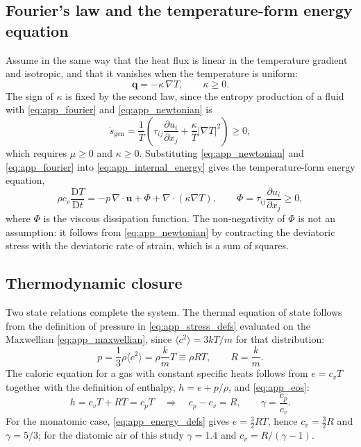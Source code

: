 \subsection{Fourier's law and the temperature-form energy equation}

Assume in the same way that the heat flux is linear in the temperature gradient and isotropic, and that it vanishes when the temperature is uniform:
\begin{equation}
    \mathbf{q} = -\kappa\,\nabla T , \qquad \kappa \ge 0 .
    \label{eq:app_fourier}
\end{equation}
The sign of $\kappa$ is fixed by the second law, since the entropy production of a fluid with \eqref{eq:app_fourier} and \eqref{eq:app_newtonian} is
\begin{equation}
    \dot{s}_{\mathrm{gen}} = \frac{1}{T}\left(\tau_{ij}\frac{\partial u_i}{\partial x_j} + \frac{\kappa}{T}|\nabla T|^2\right) \ge 0 ,
    \label{eq:app_entropy}
\end{equation}
which requires $\mu\ge0$ and $\kappa\ge0$. Substituting \eqref{eq:app_newtonian} and \eqref{eq:app_fourier} into \eqref{eq:app_internal_energy} gives the temperature-form energy equation,
\begin{equation}
    \rho c_v\frac{\mathrm{D}T}{\mathrm{D}t} = -p\,\nabla\cdot\mathbf{u} + \Phi + \nabla\cdot(\kappa\nabla T) ,
    \qquad
    \Phi = \tau_{ij}\frac{\partial u_i}{\partial x_j} \ge 0 ,
    \label{eq:app_energy_T}
\end{equation}
where $\Phi$ is the viscous dissipation function. The non-negativity of $\Phi$ is not an assumption: it follows from \eqref{eq:app_newtonian} by contracting the deviatoric stress with the deviatoric rate of strain, which is a sum of squares.

\subsection{Thermodynamic closure}

Two state relations complete the system. The thermal equation of state follows from the definition of pressure in \eqref{eq:app_stress_defs} evaluated on the Maxwellian \eqref{eq:app_maxwellian}, since $\langle c^2\rangle = 3kT/m$ for that distribution:
\begin{equation}
    p = \frac{1}{3}\rho\langle c^2\rangle = \rho\frac{k}{m}T \equiv \rho RT ,
    \qquad R = \frac{k}{m} .
    \label{eq:app_eos}
\end{equation}
The caloric equation for a gas with constant specific heats follows from $e = c_vT$ together with the definition of enthalpy, $h = e + p/\rho$, and \eqref{eq:app_eos}:
\begin{equation}
    h = c_vT + RT = c_pT
    \quad\Longrightarrow\quad
    c_p - c_v = R ,
    \qquad
    \gamma = \frac{c_p}{c_v} .
    \label{eq:app_cp_cv}
\end{equation}
For the monatomic case, \eqref{eq:app_energy_defs} gives $e = \tfrac32 RT$, hence $c_v = \tfrac32R$ and $\gamma = 5/3$; for the diatomic air of this study $\gamma = 1.4$ and $c_v = R/(\gamma-1)$.

